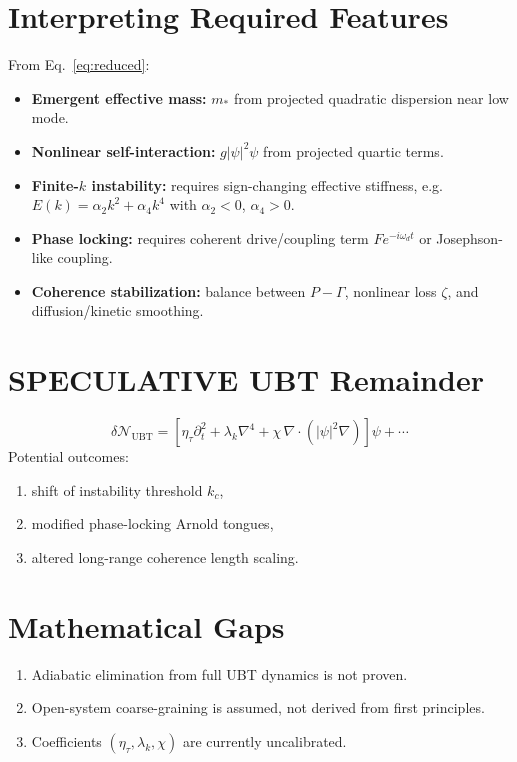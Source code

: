 \documentclass[11pt,a4paper]{article}
\begin{document}
\section{Interpreting Required Features}
From Eq.~\eqref{eq:reduced}:
\begin{itemize}
\item \textbf{Emergent effective mass:} $m_*$ from projected quadratic dispersion near low mode.
\item \textbf{Nonlinear self-interaction:} $g|\psi|^2\psi$ from projected quartic terms.
\item \textbf{Finite-$k$ instability:} requires sign-changing effective stiffness, e.g. $E(k)=\alpha_2 k^2+\alpha_4 k^4$ with $\alpha_2<0$, $\alpha_4>0$.
\item \textbf{Phase locking:} requires coherent drive/coupling term $F e^{-i\omega_d t}$ or Josephson-like coupling.
\item \textbf{Coherence stabilization:} balance between $P-\Gamma$, nonlinear loss $\zeta$, and diffusion/kinetic smoothing.
\end{itemize}

\section{SPECULATIVE UBT Remainder}
\begin{equation}
\delta\mathcal N_{\mathrm{UBT}}=\left[\eta_\tau\partial_t^2+\lambda_k\nabla^4+\chi\,\nabla\cdot(|\psi|^2\nabla)\right]\psi+\cdots
\end{equation}
Potential outcomes:
\begin{enumerate}
\item shift of instability threshold $k_c$,
\item modified phase-locking Arnold tongues,
\item altered long-range coherence length scaling.
\end{enumerate}

\section{Mathematical Gaps}
\begin{enumerate}
\item Adiabatic elimination from full UBT dynamics is not proven.
\item Open-system coarse-graining is assumed, not derived from first principles.
\item Coefficients $(\eta_\tau,\lambda_k,\chi)$ are currently uncalibrated.
\end{enumerate}
\end{document}
